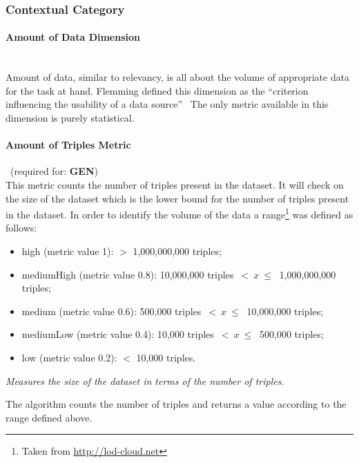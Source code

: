 \subsubsection{Contextual Category}
\label{sec:Contextual} 

\paragraph{Amount of Data Dimension}~\\ %
Amount of data, similar to relevancy, is all about the volume of appropriate data for the task at hand.
Flemming defined this dimension as the ``criterion influencing the usability of a data source''~\cite{Flemming2008}
The only metric available in this dimension is purely statistical.

\paragraph{Amount of Triples Metric}~(required for: \textbf{GEN})~\\ %
This metric counts the number of triples present in the dataset. 
It will check on the size of the dataset which is the lower bound for the number of triples present in the dataset.
In order to identify the volume of the data a range\footnote{Taken from \url{http://lod-cloud.net}} was defined as follows:
\begin{itemize}
\item high (metric value 1):  $>$ 1,000,000,000 triples;
\item mediumHigh (metric value 0.8): 10,000,000 triples~$<~x~\leq~$ 1,000,000,000 triples;
\item medium (metric value 0.6): 500,000 triples~$<~x~\leq~$ 10,000,000 triples;
\item mediumLow (metric value 0.4): 10,000 triples~$<~x~\leq~$ 500,000 triples;
\item low (metric value 0.2): $<$ 10,000 triples.
\end{itemize}

\begin{mdframed}[style=metricdefinition]
\emph{Measures the size of the dataset in terms of the number of triples.}
\end{mdframed}

The algorithm counts the number of triples and returns a value according to the range defined above.
